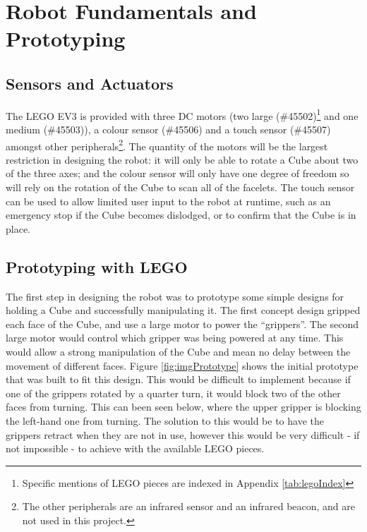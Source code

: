 \documentclass{report}
\newcommand{\legopiece}[1]{(\##1)}
\newcommand{\lego}{LEGO }
\begin{document}
    \section{Robot Fundamentals and Prototyping}
    
    \subsection{Sensors and Actuators}
    
    The \lego EV3 is provided with three DC motors (two large \legopiece{45502}\footnote{Specific mentions of \lego pieces are indexed in Appendix \ref{tab:legoIndex}} and one medium \legopiece{45503}), a colour sensor \legopiece{45506} and a touch sensor \legopiece{45507} amongst other peripherals\footnote{The other peripherals are an infrared sensor and an infrared beacon, and are not used in this project.}. The quantity of the motors will be the largest restriction in designing the robot: it will only be able to rotate a Cube about two of the three axes; and the colour sensor will only have one degree of freedom so will rely on the rotation of the Cube to scan all of the facelets. The touch sensor can be used to allow limited user input to the robot at runtime, such as an emergency stop if the Cube becomes dislodged, or to confirm that the Cube is in place.
    
    \subsection{Prototyping with \lego}
    
    The first step in designing the robot was to prototype some simple designs for holding a Cube and successfully manipulating it. The first concept design gripped each face of the Cube, and use a large motor to power the \enquote{grippers}. The second large motor would control which gripper was being powered at any time. This would allow a strong manipulation of the Cube and mean no delay between the movement of different faces. Figure \ref{fig:imgPrototype} shows the initial prototype that was built to fit this design. This would be difficult to implement because if one of the grippers rotated by a quarter turn, it would block two of the other faces from turning. This can been seen below, where the upper gripper is blocking the left-hand one from turning. The solution to this would be to have the grippers retract when they are not in use, however this would be very difficult - if not impossible - to achieve with the available \lego pieces.
    
\end{document}
